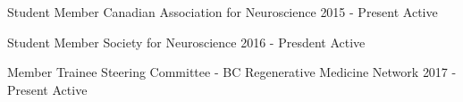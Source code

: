 

\begin{cvhonors}

  \cvhonor
    {Student Member} %
    {Canadian Association for Neuroscience} %
    {2015 - Present} %
    {Active} %

  \cvhonor
    {Student Member} %
    {Society for Neuroscience} %
    {2016 - Presdent} %
    {Active} %

  \cvhonor
    {Member} %
    {Trainee Steering Committee - BC Regenerative Medicine Network} %
    {2017 - Present} %
    {Active} %



\end{cvhonors}
